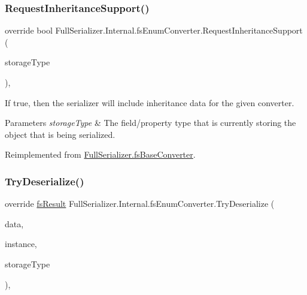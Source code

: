 \subsubsection{\texorpdfstring{Request\+Inheritance\+Support()}{RequestInheritanceSupport()}}
{\footnotesize\ttfamily override bool Full\+Serializer.\+Internal.\+fs\+Enum\+Converter.\+Request\+Inheritance\+Support (\begin{DoxyParamCaption}\item[{Type}]{storage\+Type }\end{DoxyParamCaption})\hspace{0.3cm}{\ttfamily [inline]}, {\ttfamily [virtual]}}



If true, then the serializer will include inheritance data for the given converter. 


\begin{DoxyParams}{Parameters}
{\em storage\+Type} & The field/property type that is currently storing the object that is being serialized.\\
\hline
\end{DoxyParams}


Reimplemented from \hyperlink{class_full_serializer_1_1fs_base_converter_a84447285540ab6b51efc2399d144c60c}{Full\+Serializer.\+fs\+Base\+Converter}.

\mbox{\label{class_full_serializer_1_1_internal_1_1fs_enum_converter_a083b9f0f694869aa476f0e6a333051da}} 
\subsubsection{\texorpdfstring{Try\+Deserialize()}{TryDeserialize()}}
{\footnotesize\ttfamily override \hyperlink{struct_full_serializer_1_1fs_result}{fs\+Result} Full\+Serializer.\+Internal.\+fs\+Enum\+Converter.\+Try\+Deserialize (\begin{DoxyParamCaption}\item[{\hyperlink{class_full_serializer_1_1fs_data}{fs\+Data}}]{data,  }\item[{ref object}]{instance,  }\item[{Type}]{storage\+Type }\end{DoxyParamCaption})\hspace{0.3cm}{\ttfamily [inline]}, {\ttfamily [virtual]}}



